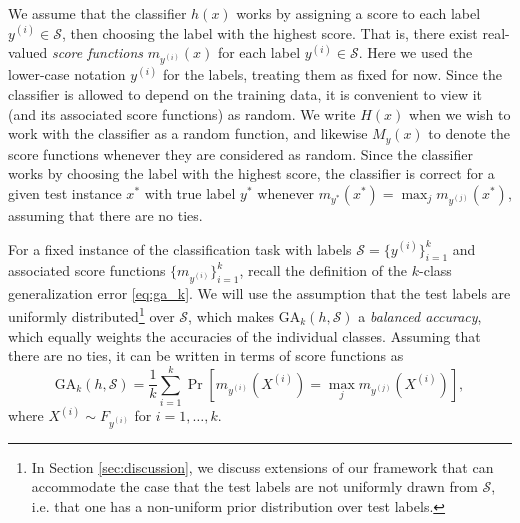 \documentclass[twoside,11pt]{article}
\begin{document}
We assume that the classifier $h(x)$ works by assigning a score to
each label $y^{(i)} \in \mathcal{S}$, then choosing the label with the
highest score.  That is, there exist real-valued \emph{score
  functions} $m_{y^{(i)}}(x)$ for each label $y^{(i)} \in
\mathcal{S}$.
Here we used the lower-case notation $y^{(i)}$ for the labels,
treating them as fixed for now. %
Since the classifier is allowed to depend on the
training data, it is convenient to view it (and its associated score
functions) as random.  We write $H(x)$ when we wish to work with the
classifier as a random function, and likewise $M_y(x)$ to denote the
score functions whenever they are considered as random.
Since the classifier works by choosing the label with the highest score,
the classifier is correct for a given test instance $x^*$ with true label $y^*$ whenever
$m_{y^*}(x^*) = \max_j m_{y^{(j)}}(x^*)$, assuming that there are no ties.

For a fixed instance of the classification task with labels
$\mathcal{S} = \{y^{(i)}\}_{i=1}^k$ and associated score functions
$\{m_{y^{(i)}}\}_{i=1}^k$, recall the definition of the $k$-class
generalization error \eqref{eq:ga_k}.
We will use the assumption that the test labels are uniformly distributed\footnote{In Section \ref{sec:discussion}, we discuss extensions of our framework that can accommodate the case that the test labels are not uniformly drawn from $\mathcal{S}$, i.e. that one has a non-uniform prior distribution over test labels.} over $\mathcal{S}$, which makes $\text{GA}_k(h, \mathcal{S})$ a \emph{balanced accuracy}, which equally weights the accuracies of the individual classes.
Assuming that there are no ties, it can be written in terms of score functions as
\[
\text{GA}_k(h, \mathcal{S}) = \frac{1}{k} \sum_{i=1}^k  \Pr[m_{y^{(i)}}(X^{(i)}) = \max_j
m_{y^{(j)}}(X^{(i)})],
\]
where $X^{(i)} \sim F_{y^{(i)}}$ for $i =1,\hdots, k$.

\end{document}
